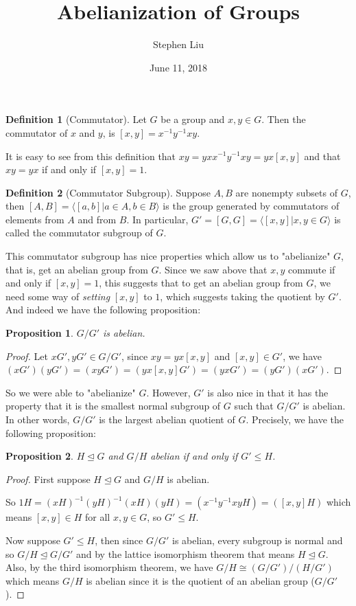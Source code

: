 \documentclass[11pt]{article}
\theoremstyle{definition}
\newtheorem*{defn}{Definition}
\theoremstyle{plain}
\theoremstyle{plain}
\newtheorem{prop}{Proposition}
\theoremstyle{plain}
\begin{document}
\author{Stephen Liu}
\title{Abelianization of Groups}
\date{June 11, 2018}

\maketitle

\begin{defn}[Commutator]
Let $G$ be a group and $x,y \in G$. Then the commutator of $x$ and $y$, is $[x,y] = x^{-1}y^{-1}xy$.
\end{defn}

It is easy to see from this definition that $xy=yxx^{-1}y^{-1}xy=yx[x,y]$ and that $xy=yx$ if and only if $[x,y]=1$.

\begin{defn}[Commutator Subgroup]
Suppose $A,B$ are nonempty subsets of $G$, then $[A,B]=\langle[a,b]| a \in A, b \in B\rangle$ is the group generated by commutators of elements from $A$ and from $B$. In particular, $G'=[G,G]=\langle[x,y]|x,y \in G\rangle$ is called the commutator subgroup of $G$.
\end{defn}

This commutator subgroup has nice properties which allow us to "abelianize" $G$, that is, get an abelian group from $G$. Since we saw above that $x,y$ commute if and only if $[x,y]=1$, this suggests that to get an abelian group from $G$, we need some way of \emph{setting} $[x,y]$ to $1$, which suggests taking the quotient by $G'$. And indeed we have the following proposition:

\begin{prop}
$G/G'$ is abelian.
\end{prop}

\begin{proof}
Let $xG',yG' \in G/G'$, since $xy=yx[x,y]$ and $[x,y] \in G'$, we have $(xG')(yG')=(xyG')=(yx[x,y]G')=(yxG')=(yG')(xG')$.
\end{proof}

So we were able to "abelianize" $G$. However, $G'$ is also nice in that it has the property that it is the smallest normal subgroup of $G$ such that $G/G'$ is abelian. In other words, $G/G'$ is the largest abelian quotient of $G$. Precisely, we have the following proposition:

\begin{prop}
$H \trianglelefteq G$ and $G/H$ abelian if and only if $G' \leq H$.
\end{prop}

\begin{proof}
First suppose $H \trianglelefteq G$ and $G/H$ is abelian. 

So $1H=(xH)^{-1}(yH)^{-1}(xH)(yH)=(x^{-1}y^{-1}xyH)=([x,y]H)$ which means $[x,y] \in H$ for all $x,y \in G$, so $G' \leq H$.

Now suppose $G' \leq H$, then since $G/G'$ is abelian, every subgroup is normal and so $G/H \trianglelefteq G/G'$ and by the lattice isomorphism theorem that means $H \trianglelefteq G$. Also, by the third isomorphism theorem, we have $G/H \cong (G/G')/(H/G')$ which means $G/H$ is abelian since it is the quotient of an abelian group ($G/G'$).
\end{proof}
\end{document}
